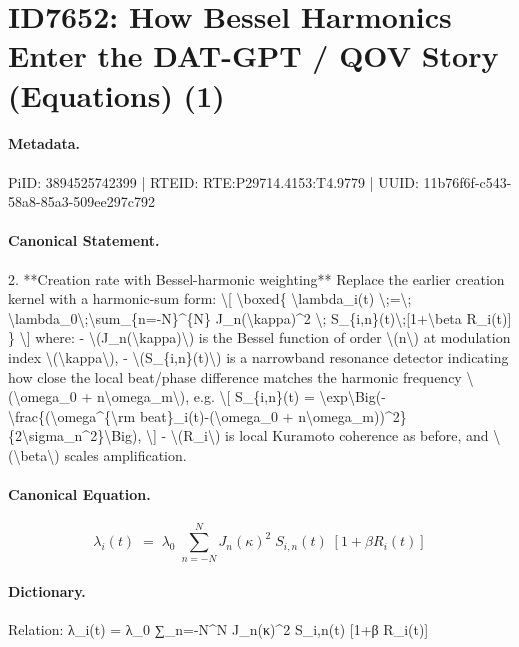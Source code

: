 \section*{ID7652: How Bessel Harmonics Enter the DAT-GPT / QOV Story (Equations) (1)}
\paragraph{Metadata.}
PiID: 3894525742399 | RTEID: RTE:P29714.4153:T4.9779 | UUID: 11b76f6f-c543-58a8-85a3-509ee297c792

\paragraph{Canonical Statement.}
2. **Creation rate with Bessel-harmonic weighting** Replace the earlier creation kernel with a harmonic-sum form: \textbackslash{}[ \textbackslash{}boxed\{ \textbackslash{}lambda\_i(t) \textbackslash{};=\textbackslash{}; \textbackslash{}lambda\_0\textbackslash{};\textbackslash{}sum\_\{n=-N\}\textasciicircum{}\{N\} J\_n(\textbackslash{}kappa)\textasciicircum{}2 \textbackslash{}; S\_\{i,n\}(t)\textbackslash{};[1+\textbackslash{}beta R\_i(t)] \} \textbackslash{}] where: - \textbackslash{}(J\_n(\textbackslash{}kappa)\textbackslash{}) is the Bessel function of order \textbackslash{}(n\textbackslash{}) at modulation index \textbackslash{}(\textbackslash{}kappa\textbackslash{}), - \textbackslash{}(S\_\{i,n\}(t)\textbackslash{}) is a narrowband resonance detector indicating how close the local beat/phase difference matches the harmonic frequency \textbackslash{}(\textbackslash{}omega\_0 + n\textbackslash{}omega\_m\textbackslash{}), e.g. \textbackslash{}[ S\_\{i,n\}(t) = \textbackslash{}exp\textbackslash{}Big(-\textbackslash{}frac\{(\textbackslash{}omega\textasciicircum{}\{\textbackslash{}rm beat\}\_i(t)-(\textbackslash{}omega\_0 + n\textbackslash{}omega\_m))\textasciicircum{}2\}\{2\textbackslash{}sigma\_n\textasciicircum{}2\}\textbackslash{}Big), \textbackslash{}] - \textbackslash{}(R\_i\textbackslash{}) is local Kuramoto coherence as before, and \textbackslash{}(\textbackslash{}beta\textbackslash{}) scales amplification.

\paragraph{Canonical Equation.}
\[
\boxed{ \lambda_i(t) \;=\; \lambda_0\;\sum_{n=-N}^{N} J_n(\kappa)^2 \; S_{i,n}(t)\;[1+\beta R_i(t)] }
\]

\paragraph{Dictionary.}
Relation: λ\_i(t) = λ\_0 ∑\_n=-N\textasciicircum{}N J\_n(κ)\textasciicircum{}2 S\_i,n(t) [1+β R\_i(t)]

